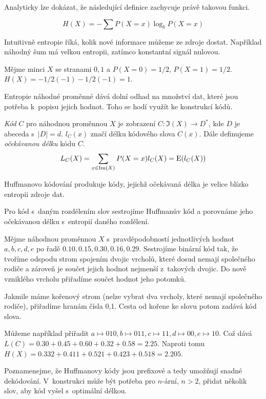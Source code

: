 Analyticky lze dokázat, že následující definice
zachycuje právě takovou funkci.



\begin{definition}
    \[ H(X) = - \sum P(X = x) \log_b P(X = x) \]
\end{definition}

Intuitivně entropie říká, kolik nové informace můžeme ze zdroje dostat.
Například náhodný šum má velkou entropii, zatímco konstantní signál
nulovou.

\begin{example}
    Mějme minci $X$ se stranami $0,1$ a $P(X = 0) = 1/2$, $P(X = 1) =
    1/2$.
    $H(X) = - 1/2 (-1) - 1/2 (-1) = 1$.
\end{example}

Entropie náhodné proměnné dává dolní odhad na množství dat, které jsou
potřeba k~popisu jejich hodnot. Toho se hodí využít ke konstrukcí kódů.

\begin{definition}
    {\em Kód} $C$ pro náhodnou proměnnou $X$ je zobrazení
    $C : \Im(X) \to D^*$, kde $D$ je abeceda s~$\lvert D \rvert = d$.
    $l_C(x)$ značí délku kódového slova $C(x)$.
    Dále definujeme {\em očekávanou délku} kódu $C$.
    \[
        L_C(X) = \sum_{x \in \Im(X)} P(X = x) l_C(X) = \operatorname{E}(l_C(X))
    \]
\end{definition}

Huffmanovo kódování produkuje kódy, jejichž očekávaná délka je velice
blízko entropii zdroje dat.

\begin{example}
    Pro kód s~daným rozdělením slov sestrojíme Huffmanův kód a porovnáme
    jeho očekávanou délku s~entropií daného rozdělení.

    Mějme náhodnou proměnnou $X$ s~pravděpodobností jednotlivých hodnot
    $a,b,c,d,e$ po řadě
    $0.10,0.15,0.30,0.16,0.29$. Sestrojíme binární kód tak, že
    tvoříme odspodu strom spojením dvojic vrcholů, které dosud nemají
    společného rodiče a zároveň je součet jejich hodnot nejmenší
    z~takových dvojic. Do nově vzniklého vrcholu přiřadíme součet hodnot
    jeho potomků.

    Jakmile máme kořenový strom (nelze vybrat dva vrcholy, které nemají
    společného rodiče), přiřadíme hranám čísla 0,1. Cesta od kořene ke
    slovu potom zadává kód slova.

    Můžeme například přiřadit $a \mapsto 010, b \mapsto 011, c\mapsto
    11, d \mapsto 00, e \mapsto 10$.
    Což dává $L(C) = 0.30+0.45+0.60+0.32+0.58 = 2.25$.
    Naproti tomu $H(X) = 0.332+0.411+0.521+0.423+0.518 = 2.205$.
\end{example}

Poznamenejme, že Huffmanovy kódy jsou prefixové a tedy umožňují snadné
dekódování. V~konstrukci může být potřeba pro $n$-ární, $n > 2$, přidat
několik  slov, aby kód vyšel s~optimální délkou.
